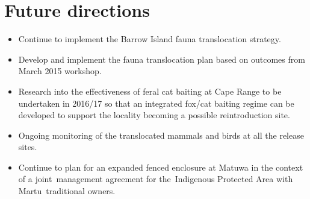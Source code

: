 \documentclass[version=last,
    paper=a4, %
    10pt, %
    usenames,
    dvipsnames,
    oneside, %
    headings=openany, %
    DIV=15 %
]{scrbook}
\begin{document}
\section*{Future directions}
\begin{itemize}
\itemsep1pt\parskip0pt
\item
  Continue to implement the Barrow Island fauna translocation strategy.
\item
  Develop and implement the fauna translocation plan based on outcomes
  from March 2015 workshop.
\item
  Research into the effectiveness of feral cat baiting at Cape Range to
  be undertaken in 2016/17 so that an integrated fox/cat baiting regime
  can be developed to support the locality becoming a possible
  reintroduction site.
\item
  Ongoing monitoring of the translocated mammals and birds at all the
  release sites.~
\item
  Continue to plan for an expanded fenced enclosure at Matuwa in the
  context of a joint~management agreement for the~Indigenous Protected
  Area with Martu~traditional owners.
\end{itemize}



\end{document}
